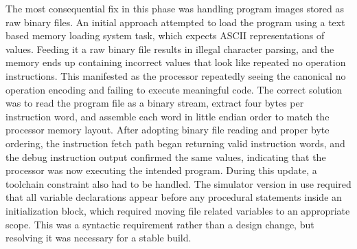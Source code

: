 \documentclass[12pt]{article}
\begin{document}
The most consequential fix in this phase was handling program images stored as raw binary files. An initial approach attempted to load the program using a text based memory loading system task, which expects ASCII representations of values. Feeding it a raw binary file results in illegal character parsing, and the memory ends up containing incorrect values that look like repeated no operation instructions. This manifested as the processor repeatedly seeing the canonical no operation encoding and failing to execute meaningful code. The correct solution was to read the program file as a binary stream, extract four bytes per instruction word, and assemble each word in little endian order to match the processor memory layout. After adopting binary file reading and proper byte ordering, the instruction fetch path began returning valid instruction words, and the debug instruction output confirmed the same values, indicating that the processor was now executing the intended program. During this update, a toolchain constraint also had to be handled. The simulator version in use required that all variable declarations appear before any procedural statements inside an initialization block, which required moving file related variables to an appropriate scope. This was a syntactic requirement rather than a design change, but resolving it was necessary for a stable build.
\end{document}
